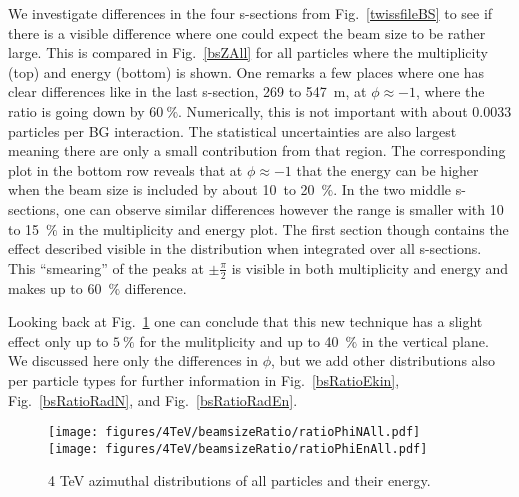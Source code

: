 
We investigate differences in the four s-sections from Fig.~\ref{twissfileBS} to see if there is a visible difference where one could expect the beam size to be rather large. This is compared in Fig.~\ref{bsZAll} for all particles where the multiplicity (top) and energy (bottom) is shown. One remarks a few places where one has clear differences like in the last s-section, 269 to 547~m, at $\phi \approx -1$, where the ratio is going down by $60~\%$. Numerically, this is not important with about 0.0033 particles per BG interaction. The statistical uncertainties are also largest meaning there are only a small contribution from that region. The corresponding plot in the bottom row reveals that at $\phi \approx -1$ that the energy can be higher when the beam size is included by about 10~to 20~$\%$.
In the two middle s-sections, one can observe similar differences however the range is smaller with 10 to 15~$\%$ in the multiplicity and energy plot. The first section though contains the effect described visible in the distribution when integrated over all s-sections. This ``smearing'' of the peaks at $\pm \frac{\pi}{2}$ is visible in both multiplicity and energy and makes up to 60~$\%$ difference.

Looking back at Fig.~\ref{bsRatioPhiAll} one can conclude that this new technique has a slight effect only up to $5~\%$ for the mulitplicity and up to 40~$\%$ in the vertical plane. We discussed here only the differences in $\phi$, but we add other distributions also per particle types for further information in Fig.~\ref{bsRatioEkin}, Fig.~\ref{bsRatioRadN}, and Fig.~\ref{bsRatioRadEn}.

\begin{figure}%
\begin{center}
  \texttt{[image: figures/4TeV/beamsizeRatio/ratioPhiNAll.pdf]}
  \texttt{[image: figures/4TeV/beamsizeRatio/ratioPhiEnAll.pdf]}
\end{center}
\vspace{-0.6cm}
 \caption{4 TeV azimuthal distributions of all particles and their energy.
  \label{bsRatioPhiAll}}
\end{figure}



